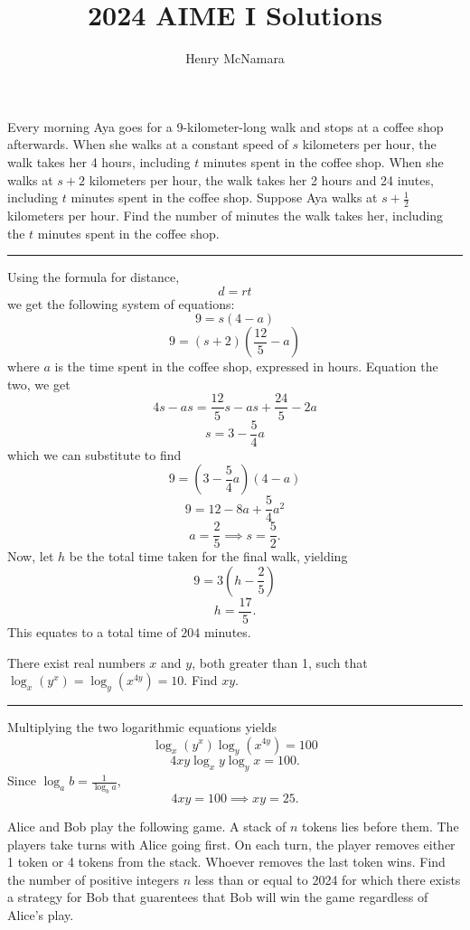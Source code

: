 \documentclass[11pt]{scrartcl}
\title{2024 AIME I Solutions}
\author{Henry McNamara}
\begin{document}
\begin{problem}
    Every morning Aya goes for a 9-kilometer-long walk and stops at a coffee shop afterwards. When she walks at a constant speed of $s$ kilometers per hour, the walk takes her 4 hours, including $t$ minutes spent in the coffee shop. When she walks at $s + 2$ kilometers per hour, the walk takes her 2 hours and 24 inutes, including $t$ minutes spent in the coffee shop. Suppose Aya walks at $s + \frac{1}{2}$ kilometers per hour. Find the number of minutes the walk takes her, including the $t$ minutes spent in the coffee shop.
\end{problem}

\rule{\textwidth}{0.4pt}

Using the formula for distance,
\[d = rt\]
we get the following system of equations:
\[9 = s(4 - a)\]
\[9 = (s + 2)(\frac{12}{5} - a)\]
where $a$ is the time spent in the coffee shop, expressed in hours. Equation the two, we get
\[4s - as = \frac{12}{5}s - as + \frac{24}{5} - 2a\]
\[s = 3 - \frac{5}{4}a\]
which we can substitute to find
\[9 = (3 - \frac{5}{4}a)(4 - a)\]
\[9 = 12 - 8a + \frac{5}{4}a^{2}\]
\[a = \frac{2}{5} \implies s = \frac{5}{2}.\]
Now, let $h$ be the total time taken for the final walk, yielding
\[9 = 3(h - \frac{2}{5})\]
\[h = \frac{17}{5}.\]
This equates to a total time of $\boxed{204}$ minutes.

\pagebreak

\begin{problem}
    There exist real numbers $x$ and $y$, both greater than 1, such that $\log_{x}\left(y^{x}\right) = \log_{y}\left(x^{4y}\right) = 10$. Find $xy$.
\end{problem}

\rule{\textwidth}{0.4pt}

Multiplying the two logarithmic equations yields
\[\log_{x}\left(y^{x}\right)\log_{y}\left(x^{4y}\right) = 100\]
\[4xy\log_{x}y\log_{y}x = 100.\]
Since $\log_{a}b = \frac{1}{\log_{b}a}$,
\[4xy = 100 \implies xy = \boxed{25}.\]

\pagebreak

\begin{problem}
    Alice and Bob play the following game. A stack of $n$ tokens lies before them. The players take turns with Alice going first. On each turn, the player removes either 1 token or 4 tokens from the stack. Whoever removes the last token wins. Find the number of positive integers $n$ less than or equal to 2024 for which there exists a strategy for Bob that guarentees that Bob will win the game regardless of Alice's play.
\end{problem}
\end{document}
